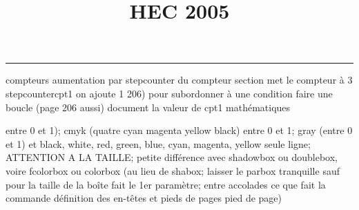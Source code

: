 \documentclass[11pt]{article}%
\title{\bf \vspace{-1cm} HEC 2005} %
\author{} %
\date{} %
\renewcommand{\headrulewidth}{0pt}%
\renewcommand{\footrulewidth}{0.4pt}%
\begin{document}
\maketitle %
\vspace{-1.2cm}\hrule %
\thispagestyle{fancy}

\vspace*{.4cm}


compteurs%
aumentation par stepcounter du compteur section%
met le compteur à 3%
stepcounter{cpt1} on ajoute 1%
206) pour subordonner à une condition %
faire une boucle (page 206 aussi) %
document la valeur de cpt1 
mathématiques\newcommand{\ch}{\operatorname{ch}} 
\newcommand{\sh}{\operatorname{sh}}
\renewcommand{\tanh}{\operatorname{th}}
\renewcommand{\sinh}{\operatorname{sh}}
\renewcommand{\cosh}{\operatorname{ch}}
\newcommand{\argsh}{\operatorname{argsh}}
\newcommand{\argch}{\operatorname{argch}}
\newcommand{\argth}{\operatorname{argth}}
\newcommand{\Id}{\operatorname{Id}}
\renewcommand{\leq}{\leq}
\renewcommand{\geq}{\geq }

\newcommand{\dlim}{\lim}
\newcommand{\dsum}{\sum}
\newcommand{\dprod}{\prod}



entre 0 et 1); cmyk (quatre cyan magenta yellow black) entre 0 et 1;
gray (entre 0 et 1) et black, white, red, green, blue, cyan, magenta,
yellow%
seule ligne; ATTENTION A LA TAILLE; petite différence avec shadowbox ou
doublebox, voire fcolorbox ou colorbox (au lieu de shabox; laisser le
parbox tranquille sauf pour la taille de la boîte
\newcommand{\Tbox}[1]{\begin{center} \shabox{\parbox{0.6
\linewidth}{#1}} \end{center}} %
fait le 1er paramètre; entre accolades ce que fait la commande
définition des en-têtes et pieds de pages\pagestyle{fancy}
\chead{}
\rfoot[ \ \thepage]{\thepage}
\cfoot{}
\lfoot{}
\thispagestyle{fancy} %
pied de page)\renewcommand{\footrulewidth}{0.4pt}
\renewcommand{\headrulewidth}{0.4pt}
\end{document}
